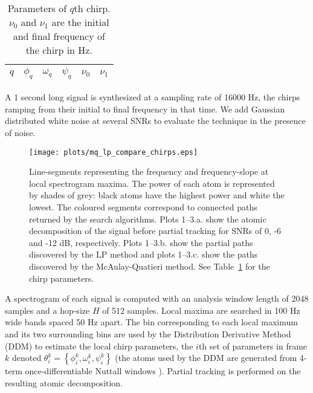 \documentclass{article}
\begin{document}
\begin{sloppy}
\begin{table}[!b]
    \caption{Parameters of $q$th chirp. $\nu_{0}$ and $\nu_{1}$ are the initial and
    final frequency of the chirp in Hz. \label{tab:ptrackexamplechirpparams}}
    \begin{center}
        \begin{tabular}{l c c c c c}
            $q$ & $\phi_{q}$ & $\omega_{q}$ & $\psi_{q}$ & $\nu_{0}$ & $\nu_{1}$ \\
            \hline
            
        \end{tabular}
    \end{center}
\end{table}

A 1 second long signal is synthesized at a sampling rate of 16000 Hz, the
chirps ramping from their initial to final frequency in that time. We add
Gaussian distributed white noise at several SNRs to evaluate the technique in the
presence of noise.

\begin{figure*}[!t]
    \centering
    \centerline{\texttt{[image: plots/mq\_lp\_compare\_chirps.eps]}}
    \caption{ Line-segments representing the frequency and frequency-slope at
        local spectrogram maxima. The power of each atom is represented by
        shades of grey: black atoms have the highest power and white the lowest.
        The coloured segments correspond to connected paths returned by the
        search algorithms. Plots 1--3.a. show the atomic decomposition of the
        signal before partial tracking for SNRs of 0, -6 and -12 dB,
        respectively.  Plots 1--3.b. show the partial paths discovered by the LP
        method and plots 1--3.c. show the paths discovered by the
        McAulay-Quatieri method.  See Table~\ref{tab:ptrackexamplechirpparams}
        for the chirp parameters.  \label{plot:mq_lp_compare_chirps}
    }
\end{figure*}

A spectrogram of each signal is computed with an analysis window length of 2048
samples and a hop-size $H$ of 512 samples. Local maxima are searched in 100 Hz
wide bands spaced 50 Hz apart. The bin corresponding to each local maximum and its two
surrounding bins are used by the Distribution Derivative Method
(DDM) \cite{betser2009sinusoidal} to estimate the
local chirp parameters, the $i$th set of parameters in frame $k$ denoted
$\theta_{i}^{k} = \left\{ \phi_{i}^{k} , \omega_{i}^{k} , \psi_{i}^{k}
\right\}$ (the atoms used by the DDM are generated from 4-term
once-differentiable Nuttall windows \cite{nuttall1981some}). Partial tracking is performed on the
resulting atomic decomposition.


\end{sloppy}
\end{document}
